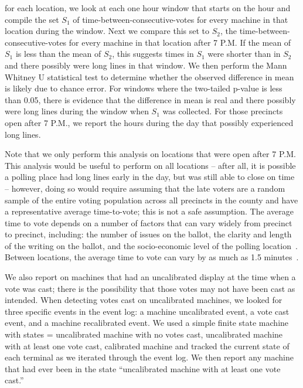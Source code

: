 \documentclass[letterpaper,twocolumn,10pt]{article}
\begin{document}
for each location, we look at each one hour window that starts on the hour and
compile the set $S_1$ of time-between-consecutive-votes for every machine in
that location during the window. Next we compare this set to $S_2$, the
time-between-consecutive-votes for every machine in that location after 7
P.M. If the mean of $S_1$ is less than the mean of $S_2$, this suggests times in
$S_1$ were shorter than in $S_2$ and there possibly were long lines in that
window. We then perform the Mann Whitney U statistical test to determine whether
the observed difference in mean is likely due to chance error. For windows where the
two-tailed p-value is less than 0.05, there is evidence that the difference in
mean is real and there possibly were long lines during the window when $S_1$ was
collected. For those precincts open after 7 P.M., we report the hours during the
day that possibly experienced long lines.

Note that we only perform this analysis on locations that were open
after 7 P.M. This analysis would be useful to perform on all locations
-- after all, it is possible a polling place had long lines early in the day, but
was still able to close on time -- however, doing so would require assuming that
the late voters are a random sample of the entire voting population across all
precincts in the county and have a representative average time-to-vote; this is
not a safe assumption. The average time to vote depends on a number of factors
that can vary widely from precinct to precinct, including: the number of issues
on the ballot, the clarity and length of the writing on the ballot, and the
socio-economic level of the polling location~\cite{Spencer2010,
  Allen2006}. Between locations, the average time to vote can vary by as much as
1.5 minutes~\cite{Spencer2010}.


We also report on machines that had an uncalibrated display at the time when a
vote was cast; there is the possibility that those votes may not have been cast
as intended. When detecting votes cast on uncalibrated machines, we looked for
three specific events in the event log: a machine uncalibrated event, a vote
cast event, and a machine recalibrated event. We used a simple finite state
machine with states = {uncalibrated machine with no votes cast, uncalibrated
  machine with at least one vote cast, calibrated machine} and tracked the
current state of each terminal as we iterated through the event log. We then
report any machine that had ever been in the state ``uncalibrated machine with
at least one vote cast.'' 
\end{document}
